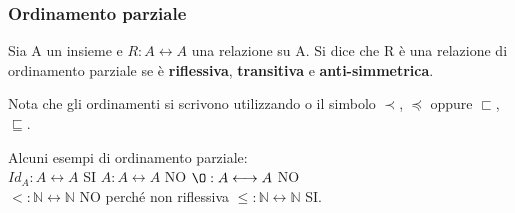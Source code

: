 \subsubsection{Ordinamento parziale}
\begin{definition}
    Sia A un insieme e $R: A \longleftrightarrow A$ una relazione su A. Si dice che R è una relazione di ordinamento parziale se è \textbf{riflessiva}, \textbf{transitiva} e \textbf{anti-simmetrica}.
\end{definition}
\begin{note}
    Nota che gli ordinamenti si scrivono utilizzando o il simbolo $\prec$, $\preceq$ oppure $\sqsubset$, $\sqsubseteq$.
\end{note}
\begin{example}
Alcuni esempi di ordinamento parziale:\\
$Id_A: A \longleftrightarrow A$ SI \hspace{.7cm} $A: A \longleftrightarrow A$ NO  \hspace{.7cm} $\O: A \longleftrightarrow A$ NO \\$<: \mathbb{N} \longleftrightarrow \mathbb{N}$ NO perché non riflessiva \hspace{.7cm} $\leq: \mathbb{N} \longleftrightarrow \mathbb{N}$ SI.
\end{example}

